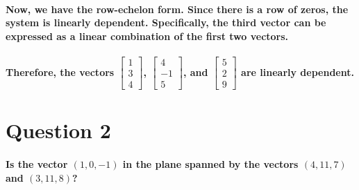 \documentclass[11pt]{article} %
\begin{document}
\begin{mdframed}
    \paragraph{Now, we have the row-echelon form. Since there is a row of zeros, the system is linearly dependent. Specifically, the third vector can be expressed as a linear combination of the first two vectors.}
    \paragraph{Therefore, the vectors \( \begin{bmatrix} 1 \\ 3 \\ 4 \end{bmatrix} \), \( \begin{bmatrix} 4 \\ -1 \\ 5 \end{bmatrix} \), and \( \begin{bmatrix} 5 \\ 2 \\ 9 \end{bmatrix} \) are linearly dependent.}
\end{mdframed}
% 
% 
% 
% 
% 
% 
% 
% 
% 
% 
% 
% 
% 
% 
% 
% 
% 
% 
% 
% 
% 
% 
% 
% 
% 
\section{Question 2}
% 
\paragraph{Is the vector $(1,0,-1)$ in the plane spanned by the vectors $(4,11,7)$ and $(3,11,8)$?}
% 
% 
\end{document}
